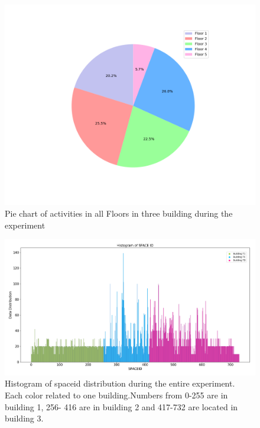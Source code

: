 \begin{figure}
    \centering
    \includegraphics[width = 12 cm]{image/Chapters/Chapter6/floors.png}
    \caption{Pie chart of activities in all Floors in three building during the experiment }
    \label{Pfloor}
\end{figure}





\begin{figure}
    \centering
    \includegraphics[width = 16 cm]{image/Chapters/Chapter6/uniqspaceid.png}
    \caption{Histogram of spaceid distribution during the entire experiment. Each color related to one building.Numbers from 0-255 are in building 1, 256- 416 are in building 2 and 417-732 are located in building 3.}
    \label{spaceiduniq }
\end{figure}



